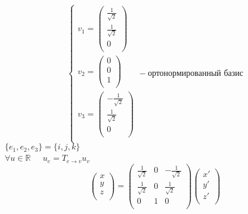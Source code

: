 \documentclass{article}
\begin{document}
    \begin{equation*}
        \begin{cases}
            v_1=
            \begin{pmatrix}
                \frac{1}{\sqrt{2}}\\
                \frac{1}{\sqrt{2}}\\
                0\\
            \end{pmatrix}\\
            v_2=
            \begin{pmatrix}
                0\\
                0\\
                1\\
            \end{pmatrix}\\
            v_3=
            \begin{pmatrix}
                -\frac{1}{\sqrt{2}}\\
                \frac{1}{\sqrt{2}}\\
                0\\
            \end{pmatrix}\\
        \end{cases} - \text{ортонормированный базис}
    \end{equation*}
    $\{e_1, e_2, e_3\} = \{i, j, k\}$\\
    $\forall u \in \mathbb{R} \; \; \; \;$
    $u_e = T_{e \to v} u_v$ \\
    \begin{equation*}
        \begin{pmatrix}
            x\\
            y\\
            z\\
        \end{pmatrix}
        =
        \begin{pmatrix}
            \frac{1}{\sqrt{2}}& 0& - \frac{1}{\sqrt{2}}\\
            \frac{1}{\sqrt{2}}& 0& \frac{1}{\sqrt{2}}\\
            0& 1& 0\\
        \end{pmatrix}
        \begin{pmatrix}
            x'\\
            y'\\
            z'\\
        \end{pmatrix}
    \end{equation*}
\end{document}
